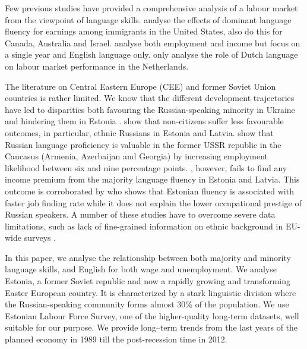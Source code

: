 \documentclass[12pt, a4paper]{article}
\begin{document}
Few previous studies have provided a comprehensive analysis of a labour
market from the viewpoint of language skills.
\citet{Chiswick1995, chiswick+miller2002, chiswick+miller2007,
 Bellante1998, Chiswick2010} analyse the effects of dominant language
fluency for earnings among immigrants in the United States, 
\citet{Chiswick1995} also do this for Canada, Australia and Israel.
\citet{leslie+lindley2001} analyse both employment and income but
focus on a single year and English language only.
\citet{YaoandOurs2015} only analyse the role of Dutch language
on labour market performance in the Netherlands. 

The literature on Central Eastern Europe (CEE) and former Soviet Union
countries is rather limited. We know that the different development
trajectories have led to disparities both favouring the Russian-speaking
minority in Ukraine \citep{Constant2011} and hindering them in Estonia
\citep{Leping2008}. \citet{Kahanec2009} show that non-citizens suffer
less favourable outcomes, in particular, ethnic Russians in Estonia and
Latvia. 
\cite{Alan2015} show that Russian language proficiency is valuable in
the former USSR republic in the Caucasus (Armenia, Azerbaijan and
Georgia) by increasing employment likelihood between six and nine
percentage points. \citet{Toomet2011}, however, fails to find any
income premium from the majority language fluency in Estonia and
Latvia. This outcome is corroborated by \citet{Lindemann2013} who shows that Estonian fluency
is associated with faster job finding rate while it does not
explain the lower occupational prestige of Russian speakers. 
A number of these studies have to overcome severe data limitations,
such as lack of fine-grained information on ethnic background in
EU-wide surveys \citep{Kahanec2010}.

In this paper, we analyse the relationship between both
majority and minority language skills, and English for both
wage and unemployment. We analyse Estonia, a former Soviet republic
and now a rapidly growing and
transforming Easter European country. It is characterized by a stark linguistic division
where the Russian-speaking community forms almost 30\% of
the population. We use Estonian Labour Force Survey, one of the
higher-quality long-term datasets, well suitable for our
purpose. We provide long--term trends from the last years
of the planned economy in 1989 till the post-recession time in 2012.
\end{document}
